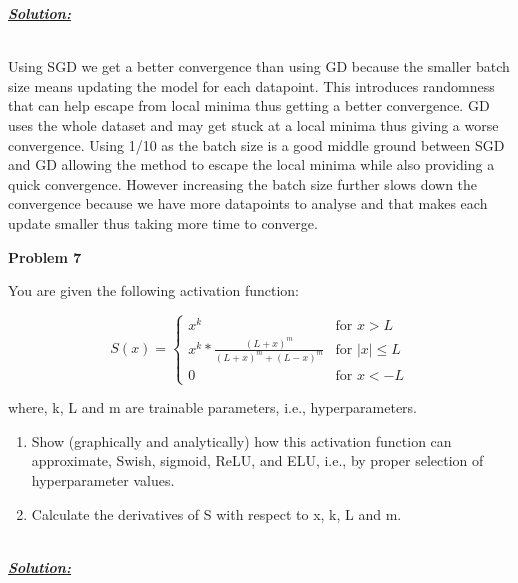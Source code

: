 \documentclass{article}
\begin{document}
\noindent \underline{\textbf{\textit{Solution:}}}

\noindent \\Using SGD we get a better convergence than using GD because the smaller batch size means updating the model for each datapoint. 
This introduces randomness that can help escape from local minima thus getting a better convergence. 
GD uses the whole dataset and may get stuck at a local minima thus giving a worse convergence. 
Using 1/10 as the batch size is a good middle ground between SGD and GD allowing the method to escape the local minima while also providing a quick convergence.
However increasing the batch size further slows down the convergence because we have more datapoints to analyse and that makes each update smaller thus taking more time to converge.

\newpage
\noindent \textbf{Problem 7}

\noindent You are given the following activation function:
\newline

\[S(x) = \begin{cases}
  x^k & \text{for } x > L \\
  x^k * \frac{(L+x)^m}{(L+x)^m + (L-x)^m} & \text{for } |x| \leq L \\
  0 & \text{for } x < -L
\end{cases}\]

\noindent where, k, L and m are trainable parameters, i.e., hyperparameters.
\begin{enumerate}[label=\Alph*]
  \item Show (graphically and analytically) how this activation function can approximate,
   Swish, sigmoid, ReLU, and ELU, i.e., by proper selection of hyperparameter values.
  \item Calculate the derivatives of S with respect to x, k, L and m. \\ \\
\end{enumerate}

\noindent \underline{\textbf{\textit{Solution:}}}
\end{document}
